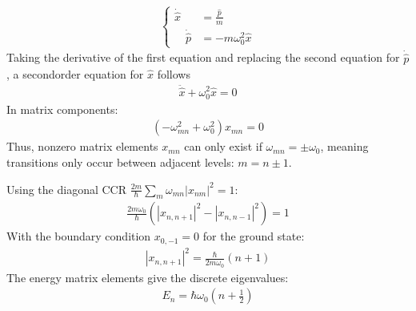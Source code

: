 \documentclass[letterpaper,10pt,english]{jupyterBook}
\begin{document}
\sphinxAtStartPar
{}
\begin{equation*}
\begin{split}\left\{ \begin{aligned}
  \dot{\hat{x}} & = \frac{\hat{p}}{m} \\
  \quad \dot{\hat{p}} & = -m\omega_0^2 \hat{x}
\end{aligned} \right.\end{split}
\end{equation*}
\sphinxAtStartPar
Taking the derivative of the first equation and replacing the second equation for \(\dot{\hat{p}}\), a second\sphinxhyphen{}order equation for \(\hat{x}\) follows
\begin{equation*}
\begin{split}\ddot{\hat{x}} + \omega_0^2 \hat{x} = 0\end{split}
\end{equation*}
\sphinxAtStartPar
In matrix components:
\begin{equation*}
\begin{split}(-\omega_{mn}^2 + \omega_0^2) x_{mn} = 0\end{split}
\end{equation*}
\sphinxAtStartPar
Thus, non\sphinxhyphen{}zero matrix elements \(x_{mn}\) can only exist if \(\omega_{mn} = \pm \omega_0\), meaning transitions only occur between adjacent levels: \(m = n \pm 1\).

\sphinxAtStartPar
{}
Using the diagonal CCR \(\frac{2m}{\hbar} \sum_m \omega_{mn} |x_{nm}|^2 = 1\):
\begin{equation*}
\begin{split}\frac{2m\omega_0}{\hbar} \left( |x_{n, n+1}|^2 - |x_{n, n-1}|^2 \right) = 1\end{split}
\end{equation*}
\sphinxAtStartPar
With the boundary condition \(x_{0,-1} = 0\) for the ground state:
\begin{equation*}
\begin{split}|x_{n, n+1}|^2 = \frac{\hbar}{2m\omega_0} (n+1)\end{split}
\end{equation*}
\sphinxAtStartPar
The energy matrix elements give the discrete eigenvalues:
\begin{equation*}
\begin{split}E_n = \hbar \omega_0 \left( n + \frac{1}{2} \right)\end{split}
\end{equation*}
\end{document}

